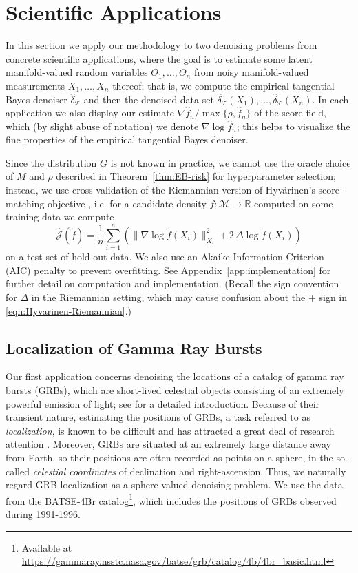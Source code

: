 \documentclass[preprint]{imsart}
\theoremstyle{plain}
\theoremstyle{definition}
\newcommand{\Rbb}{\mathbb{R}}
\newcommand{\Mcal}{\mathcal{M}}
\newcommand{\T}{\mathcal{T}}
\begin{document}
\section{Scientific Applications}\label{sec:appl}

In this section we apply our methodology to two denoising problems from concrete scientific applications, where the goal is to estimate some latent manifold-valued random variables $\Theta_1,\ldots, \Theta_n$ from noisy manifold-valued measurements $X_1,\ldots, X_n$ thereof; that is, we compute the empirical tangential Bayes denoiser $\hat{\delta}_{\T}$ and then the denoised data set $\hat{\delta}_{\T}(X_1),\ldots,\hat{\delta}_{\T}(X_n)$.
In each application we also display our estimate $\nabla \hat f_n/ \max\{\rho, \hat {f}_n\}$ of the score field, which (by slight abuse of notation) we denote $\nabla \log \hat{f}_n$; this helps to visualize the fine properties of the empirical tangential Bayes denoiser.

Since the distribution $G$ is not known in practice, we cannot use the oracle choice of $M$ and $\rho$ described in Theorem~\ref{thm:EB-risk} for hyperparameter selection; instead, we use cross-validation of the Riemannian version of Hyv\"arinen's score-matching objective \cite{de2022riemannian}, i.e. for a candidate density $\tilde{f}:\Mcal\to\Rbb$ computed on some training data we compute
\begin{equation}\label{eqn:Hyvarinen-Riemannian}
    \hat{\mathcal{J}}(\tilde{f}) = \frac{1}{n}\sum_{i=1}^{n}\left(\|\nabla\log\tilde{f}(X_i)\|_{X_i}^2 + 2\,\Delta\log\tilde{f}(X_i)\right)
\end{equation}
on a test set of hold-out data.
We also use an Akaike Information Criterion (AIC) penalty to prevent overfitting.
See Appendix~\ref{app:implementation} for further detail on computation and implementation.
(Recall the sign convention for $\Delta$ in the Riemannian setting, which may cause confusion about the $+$ sign in \eqref{eqn:Hyvarinen-Riemannian}.)

\subsection{Localization of Gamma Ray Bursts}\label{subsec:GRB}

Our first application concerns denoising the locations of a catalog of gamma ray bursts (GRBs), which are short-lived celestial objects consisting of an extremely powerful emission of light; see \cite{Piran} for a detailed introduction.
Because of their transient nature, estimating the positions of GRBs, a task referred to as \textit{localization}, is known to be difficult and has attracted a great deal of research attention \cite{UlyssesGRB, Connaughton_2015, GRB_errors}.
Moreover, GRBs are situated at an extremely large distance away from Earth, so their positions are often recorded as points on a sphere, in the so-called \textit{celestial coordinates} of declination and right-ascension.
Thus, we naturally regard GRB localization as a sphere-valued denoising problem.
We use the data from the BATSE-4Br catalog\footnote{Available at \url{https://gammaray.nsstc.nasa.gov/batse/grb/catalog/4b/4br_basic.html}}, which includes the positions of GRBs observed during 1991-1996.
\end{document}
